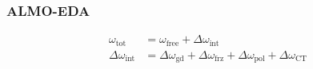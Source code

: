 \documentclass{beamer}
\begin{document}
\begin{frame}
\end{frame}

\begin{frame}
  \frametitle{ALMO-EDA}
  \begin{equation*}
    \begin{aligned}
      \omega_{\text{tot}} &= \omega_{\text{free}} + \Delta \omega_{\text{int}} \\
      \Delta \omega_{\text{int}} &= \Delta \omega_{\text{gd}} + \Delta \omega_{\text{frz}} + \Delta \omega_{\text{pol}} + \Delta \omega_{\text{CT}}
    \end{aligned}
  \end{equation*}
\end{frame}
\end{document}
